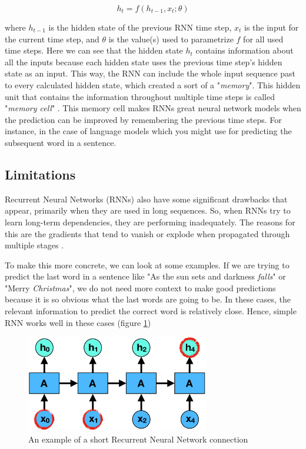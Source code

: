 \begin{equation}
        h_{t} = f(h_{t-1}, x_t; \theta)
\end{equation}

where $h_{t-1}$ is the hidden state of the previous RNN time step, $x_t$ is the input for the current time step, and $\theta$ is the value(s) used to parametrize $f$ for all used time steps. Here we can see that the hidden state $h_{t}$ contains information about all the inputs because each hidden state uses the previous time step's hidden state as an input. This way, the RNN can include the whole input sequence past to every calculated hidden state, which created a sort of a "\emph{memory}". This hidden unit that contains the information throughout multiple time steps is called "\emph{memory cell}" \parencite{geron2019hands,goodfellow2016deep}. This memory cell makes RNNs great neural network models when the prediction can be improved by remembering the previous time steps. For instance, in the case of language models which you might use for predicting the subsequent word in a sentence.



\subsection{Limitations}


Recurrent Neural Networks (RNNs) also have some significant drawbacks that appear, primarily when they are used in long sequences. So, when RNNs try to learn long-term dependencies, they are performing inadequately. The reasons for this are the gradients that tend to vanish or explode when propagated through multiple stages \parencite{graves2013speech,bengio1993problem,Olah2015Understanding}.

To make this more concrete, we can look at some examples. If we are trying to predict the last word in a sentence like "As the sun sets and darkness \emph{falls}" or "Merry \emph{Christmas}", we do not need more context to make good predictions because it is so obvious what the last words are going to be. In these cases, the relevant information to predict the correct word is relatively close. Hence, simple RNN works well in these cases (figure \ref{fig:rnn_short})

\begin{figure}[h]
    \centering
    \includegraphics[width=8cm,height=\textheight,keepaspectratio]{rnn_short}
    \caption{An example of a short Recurrent Neural Network connection}
    \label{fig:rnn_short}
\end{figure}


